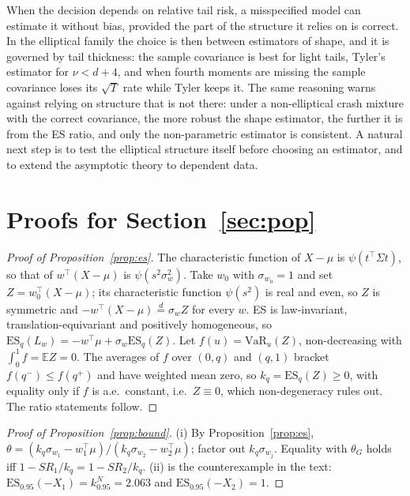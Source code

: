 \documentclass[11pt]{article}
\newcommand{\E}{\mathbb{E}}
\newcommand{\ES}{\mathrm{ES}}
\theoremstyle{remark}
\begin{document}
When the decision depends on relative tail risk, a misspecified model can estimate it without bias, provided
the part of the structure it relies on is correct. In the elliptical family the choice is then between
estimators of shape, and it is governed by tail thickness: the sample covariance is best for light tails,
Tyler's estimator for $\nu<d+4$, and when fourth moments are missing the sample covariance loses its
$\sqrt T$ rate while Tyler keeps it. The same reasoning warns against relying on structure that is not there:
under a non-elliptical crash mixture with the correct covariance, the more robust the shape estimator, the
further it is from the ES ratio, and only the non-parametric estimator is consistent. A natural next step is to
test the elliptical structure itself before choosing an estimator, and to extend the asymptotic theory to
dependent data.

\appendix
\section{Proofs for Section~\ref{sec:pop}}\label{app:pop}

\begin{proof}[Proof of Proposition~\ref{prop:es}]
The characteristic function of $X-\mu$ is $\psi(t^\top\Sigma t)$, so that of $w^\top(X-\mu)$ is
$\psi(s^2\sigma_w^2)$. Take $w_0$ with $\sigma_{w_0}=1$ and set $Z=w_0^\top(X-\mu)$; its characteristic function
$\psi(s^2)$ is real and even, so $Z$ is symmetric and $-w^\top(X-\mu)\overset d=\sigma_wZ$ for every $w$. ES is
law-invariant, translation-equivariant and positively homogeneous, so
$\ES_q(L_w)=-w^\top\mu+\sigma_w\ES_q(Z)$. Let $f(u)=\mathrm{VaR}_u(Z)$, non-decreasing with $\int_0^1f=\E Z=0$.
The averages of $f$ over $(0,q)$ and $(q,1)$ bracket $f(q^-)\le f(q^+)$ and have weighted mean zero, so
$k_q=\ES_q(Z)\ge0$, with equality only if $f$ is a.e.\ constant, i.e.\ $Z\equiv0$, which non-degeneracy rules
out. The ratio statements follow.
\end{proof}

\begin{proof}[Proof of Proposition~\ref{prop:bound}]
(i) By Proposition~\ref{prop:es}, $\theta=(k_q\sigma_{w_1}-w_1^\top\mu)/(k_q\sigma_{w_2}-w_2^\top\mu)$; factor
out $k_q\sigma_{w_j}$. Equality with $\theta_G$ holds iff $1-SR_1/k_q=1-SR_2/k_q$. (ii) is the counterexample in
the text: $\ES_{0.95}(-X_1)=k^N_{0.95}=2.063$ and $\ES_{0.95}(-X_2)=1$.
\end{proof}
\end{document}
